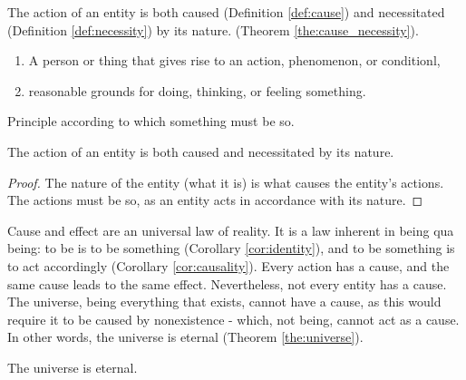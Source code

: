         The action of an entity is both caused (Definition \ref{def:cause}) and necessitated (Definition \ref{def:necessity}) by its nature. (Theorem \ref{the:cause_necessity}).

            \begin{definition}[Cause]
            \label{def:cause}
                \begin{enumerate}
                    \item A person or thing that gives rise to an action, phenomenon, or conditionl,
                    \item reasonable grounds for doing, thinking, or feeling something.
                \end{enumerate}
            \end{definition}
        
            \begin{definition}[Necessity]
            \label{def:necessity}
                Principle according to which something must be so.
            \end{definition}

            \begin{theorem}
            \label{the:cause_necessity}
                The action of an entity is both caused and necessitated by its nature.
            \end{theorem}

            \begin{proof}
                The nature of the entity (what it is) is what causes the entity's actions. The actions must be so, as an entity acts in accordance with its nature.
            \end{proof}
            
        Cause and effect are an universal law of reality. It is a law inherent in being qua being: to be is to be something (Corollary \ref{cor:identity}), and to be something is to act accordingly (Corollary \ref{cor:causality}). Every action has a cause, and the same cause leads to the same effect. Nevertheless, not every entity has a cause. The universe, being everything that exists, cannot have a cause, as this would require it to be caused by nonexistence - which, not being, cannot act as a cause. In other words, the universe is eternal (Theorem \ref{the:universe}).

            \begin{theorem}
            \label{the:universe}
                The universe is eternal.
            \end{theorem}
        
